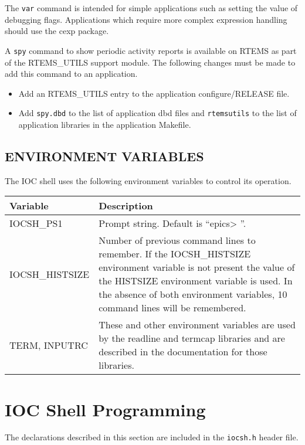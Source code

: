 The \verb|var| command is intended for simple applications such as setting the value of debugging flags.  Applications which 
require more complex expression handling should use the cexp package.

A \verb|spy| command to show periodic activity reports is available on RTEMS as part of the RTEMS\_UTILS support module.  
The following changes must be made to add this command to an application.

\begin{itemize}
\item Add an RTEMS\_UTILS entry to the application configure/RELEASE file.

\item Add \verb|spy.dbd| to the list of application dbd files and \verb|rtemsutils| to the list of application libraries in the 
application Makefile.

\end{itemize}

\subsection{ENVIRONMENT VARIABLES}

The IOC shell uses the following environment variables to control its operation.
\begin{center}
\begin{longtable}{p{1.305in}p{5.46in}}
Variable & Description\\
\hline
IOCSH\_PS1 & Prompt string. Default is ``epics\textgreater{} ''.\\
IOCSH\_HISTSIZE & Number of previous command lines to remember. If the IOCSH\_HISTSIZE environment variable is not present the value of the HISTSIZE environment variable is used.  In the absence of both environment variables, 10 command lines will be remembered.\\
TERM, INPUTRC & These and other environment variables are used by the readline and termcap libraries and are described in the documentation for those libraries.
\end{longtable}

\end{center}


\section{IOC Shell Programming}

The declarations described in this section are included in the \verb|iocsh.h| header file.


